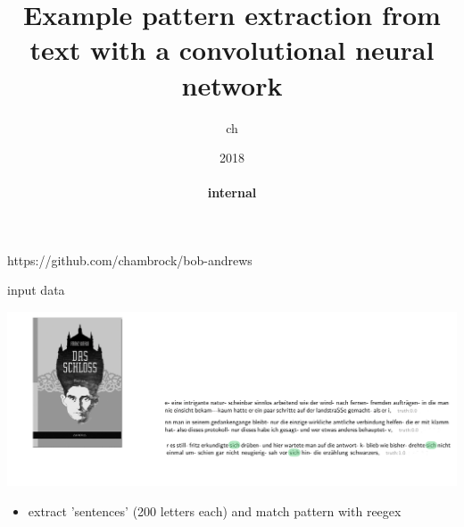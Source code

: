 \documentclass[xcolor=dvipsnames, aspectratio=1610]{beamer}
\newcommand{\gr}[1]{{\color{grcol}#1}}
\newcommand{\citeWork}[1]{ {\scriptsize{\color{Refcol} #1  \color{Black}}}}
\begin{document}
\title[Bob Andrews]{Example pattern extraction from text with a convolutional neural network}
\author{ch
}
\institute{}
\date[Hamburg, 2018]{{\small{2018}} \\ {\tiny{$~$}} \vspace{-0.2cm} \\{\bf internal}}
\begin{frame}
\begin{minipage}{0.49\textwidth}
\vspace{-0.2mm}

\end{minipage}
\begin{minipage}{0.49\textwidth}
\titlepage
\citeWork{https://github.com/chambrock/bob-andrews}
\begin{center}
\end{center}
\end{minipage}
\end{frame}






\begin{frame}{input data}
\linespread{1}\large{
\begin{minipage}{1\textwidth}
\includegraphics[width=1\textwidth]{Figures/kafkaextract1.png}
\begin{itemize}
\item extract 'sentences' \gr{(200 letters each)} and match pattern with reegex
\end{itemize}
\end{minipage}
}
\end{frame}
\end{document}
